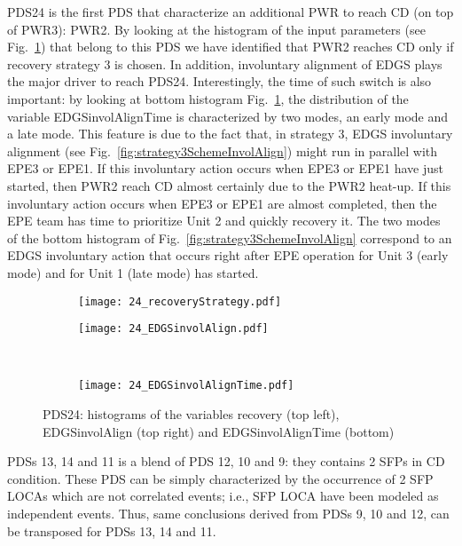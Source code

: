 PDS24 is the first PDS that characterize an additional PWR to reach CD (on top of PWR3): PWR2. By looking at the
histogram of the input parameters (see Fig.~\ref{fig:histPDS_24}) that belong to this PDS we have identified 
that PWR2 reaches CD only if recovery strategy 3 is chosen. 
In addition, involuntary alignment of EDGS plays the major driver to reach PDS24. Interestingly, the time of such 
switch is also important: by looking at bottom histogram Fig.~\ref{fig:histPDS_24}, the distribution of the 
variable EDGSinvolAlignTime is characterized by two modes, an early mode and a late mode.
This feature is due to the fact that, in strategy 3, EDGS involuntary alignment 
(see Fig.~\ref{fig:strategy3SchemeInvolAlign}) might run in parallel with EPE3 or EPE1.
If this involuntary action occurs when EPE3 or EPE1 have just started, then PWR2 reach CD almost certainly due to
the PWR2 heat-up. If this involuntary action occurs when EPE3 or EPE1 are almost completed, then the EPE team
has time to prioritize Unit 2 and quickly recovery it.
The two modes of the bottom histogram of Fig.~\ref{fig:strategy3SchemeInvolAlign} correspond to an EDGS 
involuntary action that occurs right after EPE operation for Unit 3 (early mode) and for Unit 1 (late mode) has 
started.

\begin{figure}
  \begin{subfigure}{.5\linewidth}
    \centering
    \texttt{[image: 24\_recoveryStrategy.pdf]}
  \end{subfigure}%
  \begin{subfigure}{.5\linewidth}
    \centering
    \texttt{[image: 24\_EDGSinvolAlign.pdf]}
  \end{subfigure}\\[1ex]
  \begin{subfigure}{\linewidth}
    \centering
    \texttt{[image: 24\_EDGSinvolAlignTime.pdf]}
  \end{subfigure}
  \caption{PDS24: histograms of the variables recovery (top left), EDGSinvolAlign (top right) and EDGSinvolAlignTime (bottom)}
  \label{fig:histPDS_24}
\end{figure}

PDSs 13, 14 and 11 is a blend of PDS 12, 10 and 9: they contains 2 SFPs in CD condition. These PDS can be simply characterized
by the occurrence of 2 SFP LOCAs which are not correlated events; i.e., SFP LOCA have been modeled as independent events.
Thus, same conclusions derived from PDSs 9, 10 and 12, can be transposed for PDSs 13, 14 and 11.

